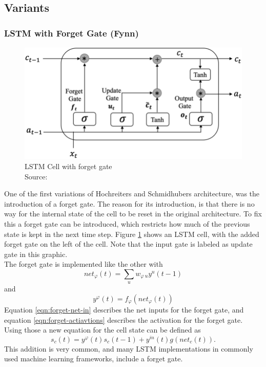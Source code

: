 \documentclass[twoside,a4paper,10pt,DIV=12,BCOR=12mm]{scrartcl}
\begin{document}
\subsection{Variants}

\subsubsection{LSTM with Forget Gate (Fynn)}
\begin{figure}
    \centering
    \includegraphics[width=0.75\linewidth]{Structure-of-LSTM-cell-which-introduces-three-special-gates-Input-Gate-i-Forget-Gate.png}
    \caption{LSTM Cell with forget gate\\ Source: \cite{nguyen2022lstmforgetgraphic}}
    \label{fig:lstm-forget}
\end{figure}
One of the first variations of Hochreiters and Schmidhubers architecture, was the introduction of a forget gate. The reason for its introduction, is that there is no way for the internal state of the cell to be reset in the original architecture. To fix this a forget gate can be introduced, which restricts how much of the previous state is kept in the next time step.\cite{gers1999forgetgate}
Figure \ref{fig:lstm-forget} shows an LSTM cell, with the added forget gate on the left of the cell. Note that the input gate is labeled as update gate in this graphic.\\
The forget gate is implemented like the other with\cite{gers1999forgetgate}
\begin{equation}
    net_\varphi(t)=\sum_uw_{\varphi\ u}y^u(t-1)
    \label{eqn:forget-net-in}
\end{equation}
and
\begin{equation}
    y^\varphi(t)=f_\varphi\left(net_\varphi(t)\right)
    \label{eqn:forget-actiavtions}
\end{equation} 
Equation \ref{eqn:forget-net-in} describes the net inputs for the forget gate, and equation \ref{eqn:forget-actiavtions} describes the activation for the forget gate. Using those a new equation for the cell state can be defined as\cite{gers1999forgetgate}
\begin{equation}
    s_c(t)=y^\varphi(t)s_c(t-1)+y^{in}(t)g\left(net_c(t)\right).    
\end{equation}
  This addition is very common, and many LSTM implementations in commonly used machine learning frameworks, include a forget gate.\cite{keras-lstm, pytorch-lstm}
\end{document}
